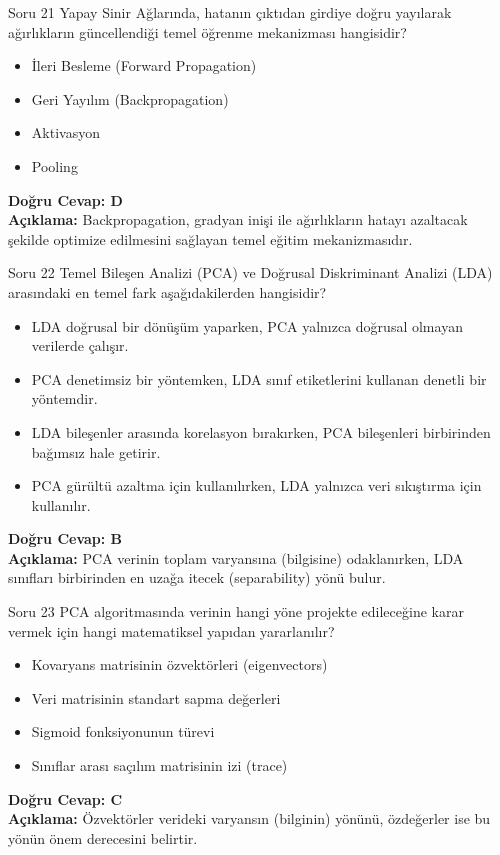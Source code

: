 \documentclass[12pt,a4paper]{article}
\begin{document}
\begin{testcard}{Soru 21}
    Yapay Sinir Ağlarında, hatanın çıktıdan girdiye doğru yayılarak ağırlıkların güncellendiği temel öğrenme mekanizması hangisidir?
    \begin{itemize}
        \item[A)] İleri Besleme (Forward Propagation)
        \item[B)] Geri Yayılım (Backpropagation)
        \item[C)] Aktivasyon
        \item[D)] Pooling
    \end{itemize}
    \tcblower
    \textbf{Doğru Cevap: D} \\
    \textbf{Açıklama:} Backpropagation, gradyan inişi ile ağırlıkların hatayı azaltacak şekilde optimize edilmesini sağlayan temel eğitim mekanizmasıdır.
\end{testcard}

\begin{testcard}{Soru 22}
    Temel Bileşen Analizi (PCA) ve Doğrusal Diskriminant Analizi (LDA) arasındaki en temel fark aşağıdakilerden hangisidir?
    \begin{itemize}
        \item[A)] LDA doğrusal bir dönüşüm yaparken, PCA yalnızca doğrusal olmayan verilerde çalışır.
        \item[B)] PCA denetimsiz bir yöntemken, LDA sınıf etiketlerini kullanan denetli bir yöntemdir.
        \item[C)] LDA bileşenler arasında korelasyon bırakırken, PCA bileşenleri birbirinden bağımsız hale getirir.
        \item[D)] PCA gürültü azaltma için kullanılırken, LDA yalnızca veri sıkıştırma için kullanılır.
    \end{itemize}
    \tcblower
    \textbf{Doğru Cevap: B} \\
    \textbf{Açıklama:} PCA verinin toplam varyansına (bilgisine) odaklanırken, LDA sınıfları birbirinden en uzağa itecek (separability) yönü bulur.
\end{testcard}

\begin{testcard}{Soru 23}
    PCA algoritmasında verinin hangi yöne projekte edileceğine karar vermek için hangi matematiksel yapıdan yararlanılır?
    \begin{itemize}
        \item[A)] Kovaryans matrisinin özvektörleri (eigenvectors)
        \item[B)] Veri matrisinin standart sapma değerleri
        \item[C)] Sigmoid fonksiyonunun türevi
        \item[D)] Sınıflar arası saçılım matrisinin izi (trace)
    \end{itemize}
    \tcblower
    \textbf{Doğru Cevap: C} \\
    \textbf{Açıklama:} Özvektörler verideki varyansın (bilginin) yönünü, özdeğerler ise bu yönün önem derecesini belirtir.
\end{testcard}
\end{document}
